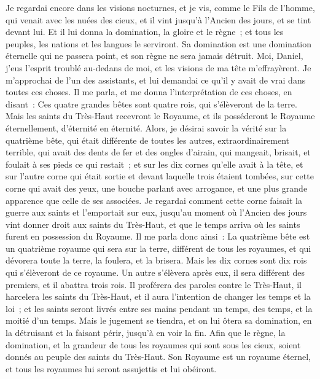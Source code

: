 \begin{multicols}{2}
Je regardai encore dans les visions nocturnes, et je vis, comme le Fils de l'homme, qui venait avec les nuées des cieux, et il vint jusqu'à l'Ancien des jours, et se tint devant lui.
Et il lui donna la domination, la gloire et le règne~; et tous les peuples, les nations et les langues le serviront. Sa domination est une domination éternelle qui ne passera point, et son règne ne sera jamais détruit.
Moi, Daniel, j'eus l'esprit troublé au-dedans de moi, et les visions de ma tête m'effrayèrent.
Je m'approchai de l'un des assistants, et lui demandai ce qu'il y avait de vrai dans toutes ces choses. Il me parla, et me donna l'interprétation de ces choses, en disant~:
Ces quatre grandes bêtes sont quatre rois, qui s'élèveront de la terre.
Mais les saints du Très-Haut recevront le Royaume, et ils posséderont le Royaume éternellement, d'éternité en éternité.
Alors, je désirai savoir la vérité sur la quatrième bête, qui était différente de toutes les autres, extraordinairement terrible, qui avait des dents de fer et des ongles d'airain, qui mangeait, brisait, et foulait à ses pieds ce qui restait~;
et sur les dix cornes qu'elle avait à la tête, et sur l'autre corne qui était sortie et devant laquelle trois étaient tombées, sur cette corne qui avait des yeux, une bouche parlant avec arrogance, et une plus grande apparence que celle de ses associées.
Je regardai comment cette corne faisait la guerre aux saints et l'emportait sur eux,
jusqu'au moment où l'Ancien des jours vint donner droit aux saints du Très-Haut, et que le temps arriva où les saints furent en possession du Royaume.
Il me parla donc ainsi~: La quatrième bête est un quatrième royaume qui sera sur la terre, différent de tous les royaumes, et qui dévorera toute la terre, la foulera, et la brisera.
Mais les dix cornes sont dix rois qui s'élèveront de ce royaume. Un autre s'élèvera après eux, il sera différent des premiers, et il abattra trois rois.
Il proférera des paroles contre le Très-Haut, il harcelera les saints du Très-Haut, et il aura l'intention de changer les temps et la loi~; et les saints seront livrés entre ses mains pendant un temps, des temps, et la moitié d'un temps.
Mais le jugement se tiendra, et on lui ôtera sa domination, en la détruisant et la faisant périr, jusqu'à en voir la fin.
Afin que le règne, la domination, et la grandeur de tous les royaumes qui sont sous les cieux, soient donnés au peuple des saints du Très-Haut. Son Royaume est un royaume éternel, et tous les royaumes lui seront assujettis et lui obéiront.

\end{multicols}
